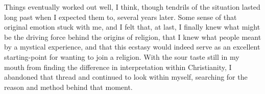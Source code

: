 Things eventually worked out well, I think, though tendrils of the situation lasted long past when I expected them to, several years later. Some sense of that original emotion stuck with me, and I felt that, at last, I finally knew what might be the driving force behind the origins of religion, that I knew what people meant by a mystical experience, and that this ecstasy would indeed serve as an excellent starting-point for wanting to join a religion. With the sour taste still in my mouth from finding the difference in interpretation within Christianity, I abandoned that thread and continued to look within myself, searching for the reason and method behind that moment.
